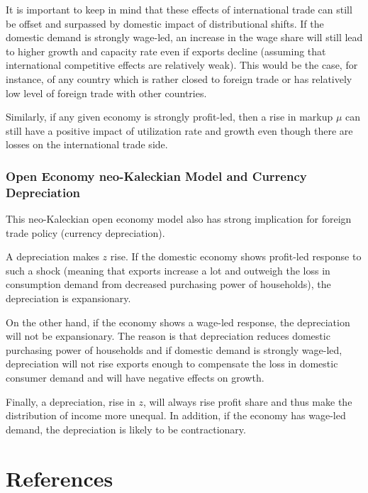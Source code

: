 \documentclass[
  letterpaper,
  DIV=11,
  numbers=noendperiod]{scrreprt}
\begin{document}
It is important to keep in mind that these effects of international
trade can still be offset and surpassed by domestic impact of
distributional shifts. If the domestic demand is strongly wage-led, an
increase in the wage share will still lead to higher growth and capacity
rate even if exports decline (assuming that international competitive
effects are relatively weak). This would be the case, for instance, of
any country which is rather closed to foreign trade or has relatively
low level of foreign trade with other countries.

Similarly, if any given economy is strongly profit-led, then a rise in
markup \(\mu\) can still have a positive impact of utilization rate and
growth even though there are losses on the international trade side.

\hypertarget{open-economy-neo-kaleckian-model-and-currency-depreciation}{%
\subsection{Open Economy neo-Kaleckian Model and Currency
Depreciation}\label{open-economy-neo-kaleckian-model-and-currency-depreciation}}

This neo-Kaleckian open economy model also has strong implication for
foreign trade policy (currency depreciation).

A depreciation makes \(z\) rise. If the domestic economy shows
profit-led response to such a shock (meaning that exports increase a lot
and outweigh the loss in consumption demand from decreased purchasing
power of households), the depreciation is expansionary.

On the other hand, if the economy shows a wage-led response, the
depreciation will not be expansionary. The reason is that depreciation
reduces domestic purchasing power of households and if domestic demand
is strongly wage-led, depreciation will not rise exports enough to
compensate the loss in domestic consumer demand and will have negative
effects on growth.

Finally, a depreciation, rise in \(z\), will always rise profit share
and thus make the distribution of income more unequal. In addition, if
the economy has wage-led demand, the depreciation is likely to be
contractionary.


\hypertarget{references}{%
\chapter*{References}\label{references}}
\end{document}
